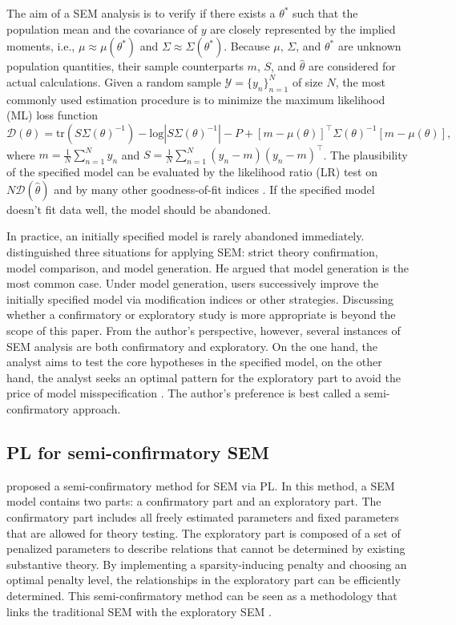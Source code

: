 \documentclass[nojss]{jss}
\begin{document}
The aim of a SEM analysis is to verify if there exists a $\theta^*$ such that the population mean and the covariance of $y$ are closely represented by the implied moments, i.e., $\mu \approx \mu(\theta^*)$ and $\Sigma \approx \Sigma(\theta^*)$. Because $\mu$, $\Sigma$, and $\theta^*$ are unknown population quantities, their sample counterparts $m$, $S$, and $\hat{\theta}$ are considered for actual calculations. Given a random sample $\mathcal{Y} = \{y_n \}_{n=1}^{N}$ of size $N$, the most commonly used estimation procedure is to minimize the maximum likelihood (ML) loss function
%
\begin{equation}
\mathcal{D}(\theta) = \mathrm{tr}(S \Sigma(\theta)^{-1} )- \mathrm{log}| S \Sigma(\theta)^{-1}| -P + [m-\mu(\theta)]^\top \Sigma(\theta)^{-1} [m-\mu(\theta)],
\end{equation}
%
where $m = \frac{1}{N} \sum_{n=1}^N y_n$ and $S = \frac{1}{N} \sum_{n=1}^N (y_n - m)(y_n - m)^\top$. The plausibility of the specified model can be evaluated by the likelihood ratio (LR) test on $N\mathcal{D}(\hat{\theta})$ and by many other goodness-of-fit indices \citep[see][for a review]{West2012}. If the specified model doesn't fit data well, the model should be abandoned. 

In practice, an initially specified model is rarely abandoned immediately. \cite{Joreskog1993} distinguished three situations for applying SEM: strict theory confirmation, model comparison, and model generation. He argued that model generation is the most common case. Under model generation, users successively improve the initially specified model via modification indices \citep[e.g.,][]{Sorbom1989} or other strategies. Discussing whether a confirmatory or exploratory study is more appropriate is beyond the scope of this paper. From the author's perspective, however, several instances of SEM analysis are both confirmatory and exploratory. On the one hand, the analyst aims to test the core hypotheses in the specified model, on the other hand, the analyst seeks an optimal pattern for the exploratory part to avoid the price of model misspecification \citep[e.g.,][]{Bentler1989,Yuan2003}. The author's preference is best called a semi-confirmatory approach.

\subsection{PL for semi-confirmatory SEM}
\cite{Huang} proposed a semi-confirmatory method for SEM via PL. In this method, a SEM model contains two parts: a confirmatory part and an exploratory part. The confirmatory part includes all freely estimated parameters and fixed parameters that are allowed for theory testing. The exploratory part is composed of a set of penalized parameters to describe relations that cannot be determined by existing substantive theory. By implementing a sparsity-inducing penalty and choosing an optimal penalty level, the relationships in the exploratory part can be efficiently determined. This semi-confirmatory method can be seen as a methodology that links the traditional SEM with the exploratory SEM \citep{Asparouhov2009}.
\end{document}
